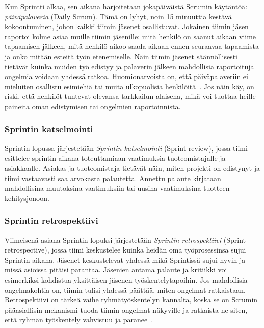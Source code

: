\documentclass[finnish]{../tktltiki2}
\theoremstyle{definition}
\theoremstyle{remark}
\begin{document}
Kun Sprintti alkaa, sen aikana harjoitetaan jokapäiväistä Scrumin käytäntöä:
\emph{päiväpalaveria} (Daily Scrum). Tämä on lyhyt, noin 15 minuuttia kestävä kokoontuminen, johon
kaikki tiimin jäsenet osallistuvat. Jokainen tiimin jäsen raportoi kolme asiaa muille tiimin jäsenille:
mitä henkilö on saanut aikaan viime tapaamisen jälkeen, mitä henkilö
aikoo saada aikaan ennen seuraavaa tapaamista ja onko mitään
esteitä työn etenemiselle. Näin tiimin jäsenet säännöllisesti tietävät
kuinka muiden työ edistyy ja palaverin jälkeen mahdollisia raportoituja
ongelmia voidaan yhdessä ratkoa. Huomionarvoista on, että päiväpalaveriin ei mieluiten osallistu esimiehiä tai muita
ulkopuolisia henkilöitä~\cite{ScrumHandBook}. Jos näin käy, on riski,
että henkilöt tuntevat olevansa tarkkailun alaisena, mikä voi
tuottaa heille paineita oman edistymisen tai ongelmien raportoinnista.

\subsubsection{Sprintin katselmointi}

Sprintin lopussa järjestetään \emph{Sprintin katselmointi} (Sprint review), jossa tiimi esittelee sprintin aikana toteuttamiaan
vaatimuksia tuoteomistajalle ja asiakkaalle. Asiakas ja tuoteomistaja
tietävät näin, miten projekti on edistynyt ja tiimi vastaavasti saa
arvokasta palautetta. Annettu palaute kirjataan mahdollisina muutoksina
vaatimuksiin tai uusina vaatimuksina tuotteen kehitysjonoon.

\subsubsection{Sprintin retrospektiivi}

Viimeisenä asiana Sprintin lopuksi järjestetään \emph{Sprintin retrospektiivi}
(Sprint retrospective), jossa tiimi keskustelee kuinka heidän
oma työprosessinsa sujui Sprintin aikana. Jäsenet
keskustelevat yhdessä mikä Sprintissä sujui hyvin ja missä
asioissa pitäisi parantaa. Jäsenien antama palaute ja kritiikki
voi esimerkiksi kohdistua yksittäisen jäsenen työskentelytapoihin.
Jos mahdollisia ongelmakohtia on, tiimin tulisi yhdessä päättää,
miten ongelmat ratkaistaan. Retrospektiivi on tärkeä vaihe
ryhmätyöskentelyn kannalta, koska se on Scrumin pääasiallisin
mekanismi tuoda tiimin ongelmat näkyville ja ratkaista ne siten,
että ryhmän työskentely vahvistuu ja paranee~\cite{Scrumprimer}.\\
\end{document}
